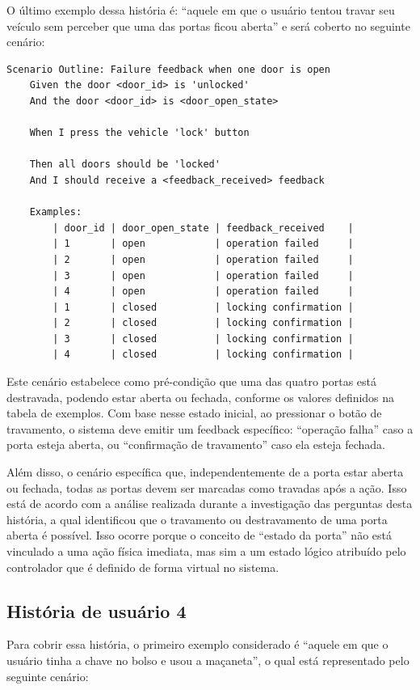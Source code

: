 O último exemplo dessa história é: “aquele em que o usuário tentou travar seu veículo sem perceber que uma das portas ficou aberta” e será coberto no seguinte cenário:

\begin{verbatim}
Scenario Outline: Failure feedback when one door is open
    Given the door <door_id> is 'unlocked'
    And the door <door_id> is <door_open_state>

    When I press the vehicle 'lock' button

    Then all doors should be 'locked'
    And I should receive a <feedback_received> feedback

    Examples:
        | door_id | door_open_state | feedback_received    |
        | 1       | open            | operation failed     |
        | 2       | open            | operation failed     |
        | 3       | open            | operation failed     |
        | 4       | open            | operation failed     |
        | 1       | closed          | locking confirmation |
        | 2       | closed          | locking confirmation |
        | 3       | closed          | locking confirmation |
        | 4       | closed          | locking confirmation |
\end{verbatim}

Este cenário estabelece como pré-condição que uma das quatro portas está destravada, podendo estar aberta ou fechada, conforme os valores definidos na tabela de exemplos. 
Com base nesse estado inicial, ao pressionar o botão de travamento, o sistema deve emitir um feedback específico: “operação falha” caso a porta esteja aberta, ou 
“confirmação de travamento” caso ela esteja fechada.

Além disso, o cenário específica que, independentemente de a porta estar aberta ou fechada, todas as portas devem ser marcadas como travadas após a ação. Isso está 
de acordo com a análise realizada durante a investigação das perguntas desta história, a qual identificou que o travamento ou destravamento de uma porta aberta é possível. 
Isso ocorre porque o conceito de “estado da porta” não está vinculado a uma ação física imediata, mas sim a um estado lógico atribuído pelo controlador que é definido 
de forma virtual no sistema.


\subsection{História de usuário 4}

Para cobrir essa história, o primeiro exemplo considerado é “aquele em que o usuário tinha a chave no bolso e usou a maçaneta”, o qual está representado pelo seguinte cenário:

